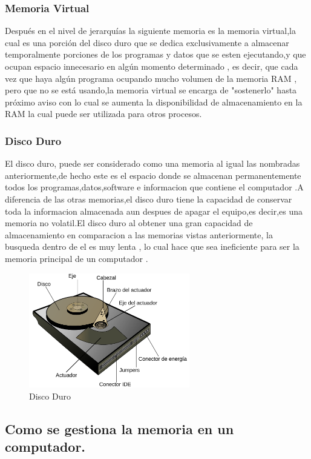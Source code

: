 \documentclass{article}
\begin{document}
\subsubsection{Memoria Virtual}
Después en el nivel de jerarquías la siguiente memoria es la memoria virtual,la cual es una porción del disco duro que se dedica exclusivamente a almacenar temporalmente porciones de los programas y datos que se esten ejecutando,y que ocupan espacio innecesario en algún momento determinado , es decir, que cada vez que haya algún programa ocupando mucho volumen de la memoria RAM , pero que no se está usando,la memoria virtual se encarga de "sostenerlo" hasta próximo aviso con lo cual se aumenta la disponibilidad de almacenamiento en la RAM la cual puede ser utilizada para otros procesos\cite{augusto}.

\subsubsection{Disco Duro}
El disco duro, puede ser considerado como una memoria al igual las nombradas anteriormente,de hecho este es el espacio donde se almacenan permanentemente todos los programas,datos,software e informacion que contiene el computador .A diferencia de las otras memorias,el disco duro tiene la capacidad de conservar toda la informacion almacenada aun despues de apagar el equipo,es decir,es una memoria no volatil.El disco duro al obtener una gran capacidad de almacenamiento en comparacion a las memorias vistas anteriormente, la busqueda dentro de el es muy lenta , lo cual hace que sea ineficiente para ser la memoria principal de un computador \cite{disco}.

\begin{figure}[h]
\includegraphics[width=7cm]{HDD.png}
\centering
\caption{Disco Duro}
\label{hdd}
\end{figure}


\subsection{Como se gestiona la memoria en un computador.} \label{contenido}
\end{document}
